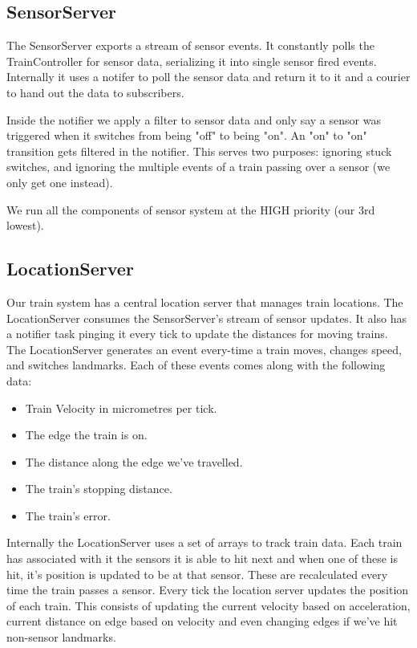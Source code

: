 \documentclass{article}
\begin{document}
\subsection{SensorServer}

The SensorServer exports a stream of sensor events. It constantly polls the TrainController for sensor data, serializing it into single sensor fired events. Internally it uses a notifer to poll the sensor data and return it to it and a courier to hand out the data to subscribers.

Inside the notifier we apply a filter to sensor data and only say a sensor was triggered when it switches from being "off" to being "on". An "on" to "on" transition gets filtered in the notifier. This serves two purposes: ignoring stuck switches, and ignoring the multiple events of a train passing over a sensor (we only get one instead).

We run all the components of sensor system at the HIGH priority (our 3rd lowest).

\subsection{LocationServer}

Our train system has a central location server that manages train locations. The LocationServer consumes the SensorServer's stream of sensor updates. It also has a notifier task pinging it every tick to update the distances for moving trains. The LocationServer generates an event every-time a train moves, changes speed, and switches landmarks. Each of these events comes along with the following data:

\begin{itemize}
    \item Train Velocity in micrometres per tick.
    \item The edge the train is on.
    \item The distance along the edge we've travelled.
    \item The train's stopping distance.
    \item The train's error.
\end{itemize}

Internally the LocationServer uses a set of arrays to track train data. Each train has associated with it the sensors it is able to hit next and when one of these is hit, it's position is updated to be at that sensor. These are recalculated every time the train passes a sensor. Every tick the location server updates the position of each train. This consists of updating the current velocity based on acceleration, current distance on edge based on velocity and even changing edges if we've hit non-sensor landmarks.
\end{document}

